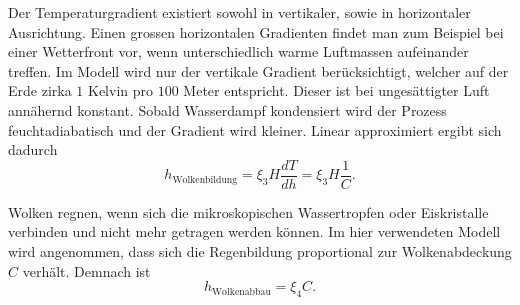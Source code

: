 \begin{refsection}
Der Temperaturgradient existiert sowohl in vertikaler, sowie in horizontaler Ausrichtung. Einen grossen horizontalen Gradienten findet man zum Beispiel bei einer Wetterfront vor, wenn unterschiedlich warme Luftmassen aufeinander treffen. Im Modell wird nur der vertikale Gradient berücksichtigt, welcher auf der Erde zirka $1$ Kelvin pro $100$ Meter entspricht. Dieser ist bei ungesättigter Luft annähernd konstant. Sobald Wasserdampf kondensiert wird der Prozess feuchtadiabatisch und der Gradient wird kleiner. Linear approximiert ergibt sich dadurch
\begin{equation}
h_{\text{Wolkenbildung}} = \xi_3 H \frac{dT}{dh} = \xi_3 H \frac{1}{C} \text{.}
\end{equation}

Wolken regnen, wenn sich die mikroskopischen Wassertropfen oder Eiskristalle verbinden und nicht mehr getragen werden können. Im hier verwendeten Modell wird angenommen, dass sich die Regenbildung proportional zur Wolkenabdeckung $C$ verhält. Demnach ist
%
%
\begin{equation}
h_{\text{Wolkenabbau}} = \xi_4 C \text{.}
\end{equation}


%



\end{refsection}
